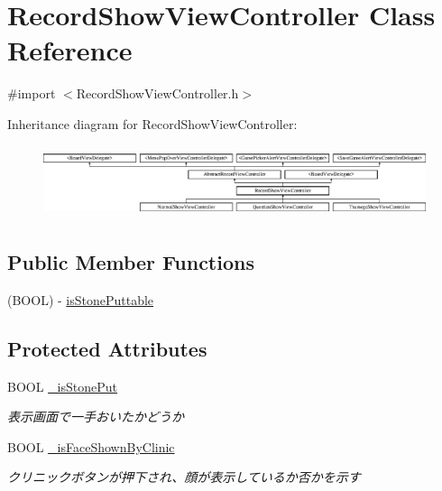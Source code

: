 \hypertarget{interface_record_show_view_controller}{
\section{RecordShowViewController Class Reference}
\label{interface_record_show_view_controller}
}


{\ttfamily \#import $<$RecordShowViewController.h$>$}

Inheritance diagram for RecordShowViewController:\begin{figure}[H]
\begin{center}
\leavevmode
\includegraphics[height=2.129278cm]{interface_record_show_view_controller}
\end{center}
\end{figure}
\subsection*{Public Member Functions}
\begin{DoxyCompactItemize}
\item 
(BOOL) -\/ \hyperlink{interface_record_show_view_controller_a892db591ec1493f1b48339698cd6ad5e}{isStonePuttable}
\end{DoxyCompactItemize}
\subsection*{Protected Attributes}
\begin{DoxyCompactItemize}
\item 
\hypertarget{interface_record_show_view_controller_a90f039e162a2d1b038cdeebec237f007}{
BOOL \hyperlink{interface_record_show_view_controller_a90f039e162a2d1b038cdeebec237f007}{\_\-isStonePut}}
\label{interface_record_show_view_controller_a90f039e162a2d1b038cdeebec237f007}

\begin{DoxyCompactList}\small\item\em 表示画面で一手おいたかどうか \end{DoxyCompactList}\item 
\hypertarget{interface_record_show_view_controller_a6eb486f0ca633618550a426cf26ac9ca}{
BOOL \hyperlink{interface_record_show_view_controller_a6eb486f0ca633618550a426cf26ac9ca}{\_\-isFaceShownByClinic}}
\label{interface_record_show_view_controller_a6eb486f0ca633618550a426cf26ac9ca}

\begin{DoxyCompactList}\small\item\em クリニックボタンが押下され、顔が表示しているか否かを示す \end{DoxyCompactList}\end{DoxyCompactItemize}


